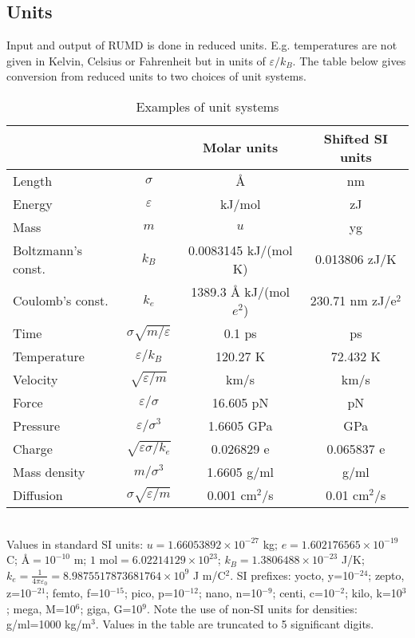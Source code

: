 \documentclass[a4paper]{article}
\begin{document}
\subsection{Units} 
Input and output of RUMD is done in reduced units. E.g. temperatures are not given in Kelvin, Celsius or Fahrenheit but in units of $\varepsilon/k_B$. The table below gives conversion from reduced units to two choices of unit systems.
\begin{table}
\begin{center}
\caption{\label{realUnits} Examples of unit systems}
\begin{tabular}{ l  c | c c }
 	& 	& Molar units & Shifted SI units \\
\hline
Length	& $\sigma$					& \AA		& nm  \\
Energy	& $\varepsilon$					& kJ/mol 	& zJ  \\
Mass	& $m$						& $u$		& yg \\
\hline 
Boltzmann's const. & $k_B$				& 0.0083145 kJ/(mol K) & 0.013806 zJ/K  \\
Coulomb's const. & $k_e$ 				& 1389.3 {\AA} kJ/(mol $e^{2}$) & 230.71 nm zJ/e$^2$  \\ 
\hline
Time		& $\sigma\sqrt{m/\varepsilon}$  	& 0.1 ps 	& ps \\
Temperature	& $\varepsilon/k_B$			& 120.27 K	& 72.432 K\\
Velocity	& $\sqrt{\varepsilon/m}$		& km/s 		& km/s \\
Force		& $\varepsilon/\sigma$			& 16.605 pN 	& pN \\
Pressure	& $\varepsilon/\sigma^3$		& 1.6605 GPa 	& GPa \\
Charge		& $\sqrt{\varepsilon\sigma/k_e}$	& 0.026829 e	& 0.065837 e  \\
Mass density	& $m/\sigma^3$				& 1.6605 g/ml   & g/ml \\
Diffusion  & $\sigma\sqrt{\varepsilon/m}$ 		& 0.001 cm$^2$/s & 0.01 cm$^2$/s \\
\hline
\end{tabular} 
\end{center}
\ \\ Values in standard SI units: $u=1.66053892 \times 10^{-27}$ kg; $e = 1.602176565\times10^{-19}$ C; $\textrm{\AA}=10^{-10}$ m; $1\textrm{ mol}=6.02214129\times10^{23}$; $k_B=1.3806488\times10^{-23}$ J/K; $k_e=\frac{1}{4\pi\varepsilon_0}=8.9875517873681764\times10^9$ J m/C$^2$.  SI prefixes: yocto, y=10$^{-24}$; zepto, z=10$^{-21}$; femto, f=10$^{-15}$; pico, p=10$^{-12}$; nano, n=10$^{-9}$; centi, c=10$^{-2}$; kilo, k=10$^{3}$; mega, M=10$^{6}$; giga, G=10$^{9}$. Note the use of non-SI units for densities: g/ml=1000 kg/m$^3$. Values in the table are truncated to 5 significant digits. 
\end{table} 
\end{document}
